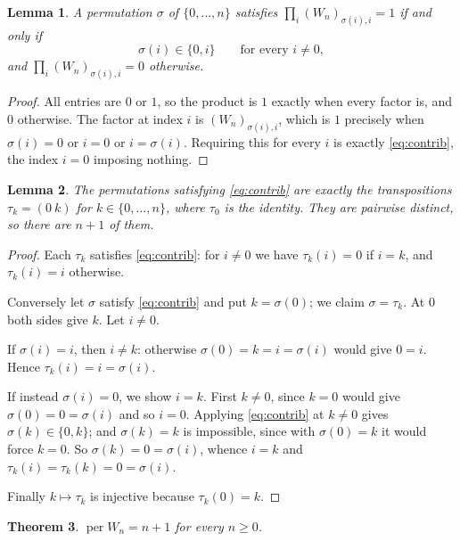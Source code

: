 \documentclass[11pt]{article}
\theoremstyle{plain}
\newtheorem{theorem}{Theorem}
\newtheorem{lemma}[theorem]{Lemma}
\theoremstyle{definition}
\theoremstyle{remark}
\DeclareMathOperator{\per}{per}
\begin{document}
\begin{lemma}\label{lem:contrib}
A permutation $\sigma$ of $\{0,\ldots,n\}$ satisfies
$\prod_i (W_n)_{\sigma(i),i}=1$ if and only if
\begin{equation}\label{eq:contrib}
  \sigma(i)\in\{0,i\}\qquad\text{for every }i\ne0 ,
\end{equation}
and $\prod_i (W_n)_{\sigma(i),i}=0$ otherwise.
\end{lemma}

\begin{proof}
All entries are $0$ or $1$, so the product is $1$ exactly when every factor is,
and $0$ otherwise. The factor at index $i$ is $(W_n)_{\sigma(i),i}$, which is
$1$ precisely when $\sigma(i)=0$ or $i=0$ or $i=\sigma(i)$. Requiring this for
every $i$ is exactly \eqref{eq:contrib}, the index $i=0$ imposing nothing.
\end{proof}

\begin{lemma}\label{lem:swaps}
The permutations satisfying \eqref{eq:contrib} are exactly the transpositions
$\tau_k=(0\ k)$ for $k\in\{0,\ldots,n\}$, where $\tau_0$ is the identity. They
are pairwise distinct, so there are $n+1$ of them.
\end{lemma}

\begin{proof}
Each $\tau_k$ satisfies \eqref{eq:contrib}: for $i\ne0$ we have $\tau_k(i)=0$
if $i=k$, and $\tau_k(i)=i$ otherwise.

Conversely let $\sigma$ satisfy \eqref{eq:contrib} and put $k=\sigma(0)$; we
claim $\sigma=\tau_k$. At $0$ both sides give $k$. Let $i\ne0$.

If $\sigma(i)=i$, then $i\ne k$: otherwise $\sigma(0)=k=i=\sigma(i)$ would give
$0=i$. Hence $\tau_k(i)=i=\sigma(i)$.

If instead $\sigma(i)=0$, we show $i=k$. First $k\ne0$, since $k=0$ would give
$\sigma(0)=0=\sigma(i)$ and so $i=0$. Applying \eqref{eq:contrib} at $k\ne0$
gives $\sigma(k)\in\{0,k\}$; and $\sigma(k)=k$ is impossible, since with
$\sigma(0)=k$ it would force $k=0$. So $\sigma(k)=0=\sigma(i)$, whence $i=k$
and $\tau_k(i)=\tau_k(k)=0=\sigma(i)$.

Finally $k\mapsto\tau_k$ is injective because $\tau_k(0)=k$.
\end{proof}

\begin{theorem}\label{thm:per}
$\per W_n=n+1$ for every $n\ge0$.
\end{theorem}
\end{document}

